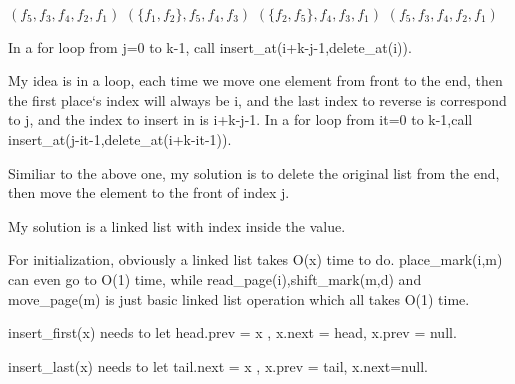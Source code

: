 \documentclass[12pt,twoside]{article}
\begin{document}


\begin{problems}

\problem  %

\begin{problemparts}
\problempart %
\((f_5,f_3,f_4,f_2,f_1)\)
\problempart %
\((\{f_1,f_2\},f_5,f_4,f_3)\)
\problempart %
\((\{f_2,f_5\},f_4,f_3,f_1)\)
\problempart %
\((f_5,f_3,f_4,f_2,f_1)\)
\end{problemparts}

\newpage
\problem  %

\begin{problemparts}
\problempart %
In a for loop from j=0 to k-1, call insert\_at(i+k-j-1,delete\_at(i)).

My idea is in a loop, each time we move one element from front to the end,
then the first place`s  index will always be i, and the last index to reverse is correspond
to j, and the index to insert in is i+k-j-1.
\problempart %
In a for loop from it=0 to k-1,call insert\_at(j-it-1,delete\_at(i+k-it-1)).

Similiar to the above one, my solution is to delete the original list from the end,
then move the element to the front of index j.
\end{problemparts}

\newpage
\problem  %
My solution is a linked list with index inside the value.

For initialization, obviously a linked list takes O(x) time to do.
place\_mark(i,m) can even go to O(1) time, while read\_page(i),shift\_mark(m,d) and
move\_page(m) is just basic linked list operation which all takes O(1) time.
\newpage
\problem  %

\begin{problemparts}
\problempart %
insert\_first(x) needs to let head.prev = x , x.next = head, x.prev = null.

insert\_last(x) needs to let tail.next = x , x.prev = tail, x.next=null.


\end{problemparts}
\end{problems}
\end{document}
